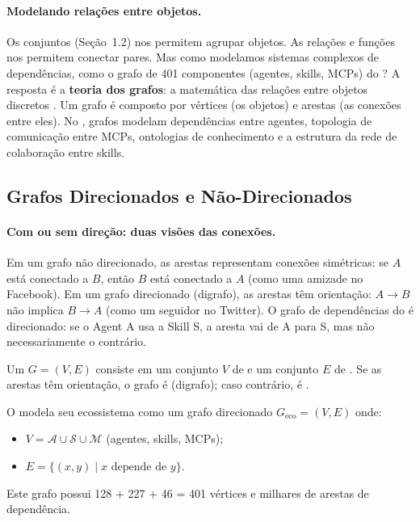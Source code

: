 \paragraph{Modelando relações entre objetos.} Os conjuntos (Seção~1.2) nos
permitem agrupar objetos. As relações e funções nos permitem conectar pares.
Mas como modelamos sistemas complexos de dependências, como o grafo de 401
componentes (agentes, skills, MCPs) do \opencodeeco{}? A resposta é a
\textbf{teoria dos grafos}: a matemática das relações entre objetos
discretos \cite{barabasi2016network, wooldridge2009multiagent}. Um grafo é
composto por vértices (os objetos) e arestas (as conexões entre eles). No
\opencodeeco{}, grafos modelam dependências entre agentes, topologia de
comunicação entre MCPs, ontologias de conhecimento e a estrutura da rede de
colaboração entre skills.

\subsection{Grafos Direcionados e Não-Direcionados}

\paragraph{Com ou sem direção: duas visões das conexões.} Em um grafo não
direcionado, as arestas representam conexões simétricas: se $A$ está
conectado a $B$, então $B$ está conectado a $A$ (como uma amizade no
Facebook). Em um grafo direcionado (digrafo), as arestas têm orientação:
$A \to B$ não implica $B \to A$ (como um seguidor no Twitter). O grafo de
dependências do \opencodeeco{} é direcionado: se o Agent A usa a Skill S,
a aresta vai de A para S, mas não necessariamente o contrário.

\begin{definicao}[Grafo]
    Um  $G = (V, E)$ consiste em um conjunto $V$ de
     e um conjunto $E$ de . Se as
    arestas têm orientação, o grafo é  (digrafo); caso
    contrário, é .
\end{definicao}

\begin{exemplo}
    O \opencodeeco{} modela seu ecossistema como um grafo direcionado
    $G_{\text{eco}} = (V, E)$ onde:
    \begin{itemize}
        \item $V = \mathcal{A} \cup \mathcal{S} \cup \mathcal{M}$ (agentes,
              skills, MCPs);
        \item $E = \{(x, y) \mid x \text{ depende de } y\}$.
    \end{itemize}
    Este grafo possui 128 + 227 + 46 = 401 vértices e milhares de arestas
    de dependência.
\end{exemplo}

